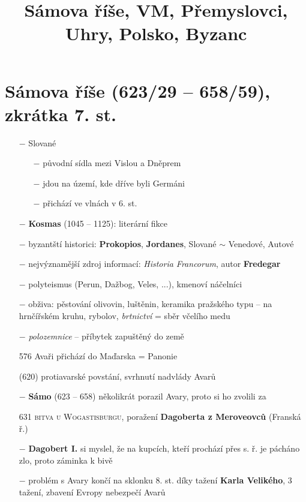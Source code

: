\documentclass{article}
\title{\vspace{-2cm}Sámova říše, VM, Přemyslovci, Uhry, Polsko, Byzanc\vspace{-1.7cm}}
\date{}
\author{}
\begin{document}
\maketitle

\section*{Sámova říše (623/29 -- 658/59), zkrátka 7. st.}
\begin{itemize}
    \vspace{-0.5em}
    \setlength\itemsep{0.15em}
    \item[$-$] Slované
    \begin{itemize}
        \vspace{-0.5em}
        \setlength\itemsep{0.15em}
        \item[$-$] původní sídla mezi Vislou a Dněprem
        \item[$-$] jdou na území, kde dříve byli Germáni
        \item[$-$] přichází ve vlnách v 6. st.
    \end{itemize}
    \item[$-$] \textbf{Kosmas} (1045 -- 1125): literární fikce
    \item[$-$] byzantští historici: \textbf{Prokopios}, \textbf{Jordanes}, Slované $\sim$ Venedové, Autové
    \item[$-$] nejvýznamější zdroj informací: \textit{Historia Francorum}, autor \textbf{Fredegar}
    \item[$-$] polyteismus (Perun, Dažbog, Veles, ...), kmenoví náčelníci
    \item[$-$] obživa: pěstování olivovin, luštěnin, keramika pražského typu -- na hrnčířském kruhu, rybolov, \textit{brtnictví} = sběr včelího medu
    \item[$-$] \textit{polozemnice} -- příbytek zapuštěný do země
    \item[576] Avaři přichází do Maďarska = Panonie
    \item[(620)] protiavarské povstání, svrhnutí nadvlády Avarů
    \item[$-$] \textbf{Sámo} (623 -- 658) několikrát porazil Avary, proto si ho zvolili za 
    \item[631] \textsc{bitva u Wogastisburgu}, poražení \textbf{Dagoberta z Meroveovců} (Franská ř.)
    \item[$-$] \textbf{Dagobert I.} si myslel, že na kupcích, kteří prochází přes s. ř. je pácháno zlo, proto záminka k bivě
    \item[$-$] problém s Avary končí na sklonku 8. st. díky tažení \textbf{Karla Velikého}, 3 tažení, zbavení Evropy nebezpečí Avarů
\end{itemize}
\end{document}
